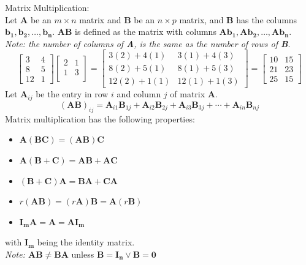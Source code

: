 \documentclass[nobib]{tufte-handout}
\begin{document}
Matrix Multiplication:\\
Let \textbf{A} be an $m\times n$ matrix and \textbf{B} be an $n\times p$ matrix, and \textbf{B} has the columns $\mathbf{b_1,b_2,\ldots,b_n}$. \textbf{AB} is defined as the matrix with columns $\mathbf{Ab_1,Ab_2,\ldots,Ab_n}$.\\
\textit{Note: the number of columns of \textbf{A}, is the same as the number of rows of \textbf{B}}.
\begin{equation*}
    \begin{bmatrix}
        3 & 4\\
        8 & 5\\
        12 & 1
    \end{bmatrix}
    \begin{bmatrix}
        2 & 1\\
        1 & 3\\
    \end{bmatrix}
    =
    \begin{bmatrix}
        3(2)+4(1) & 3(1)+4(3)\\
        8(2)+5(1) & 8(1)+5(3)\\
        12(2)+1(1) & 12(1)+1(3)
    \end{bmatrix} =
    \begin{bmatrix}
        10 & 15\\
        21 & 23\\
        25 & 15
    \end{bmatrix}
\end{equation*}
Let $\mathbf{A}_{ij}$ be the entry in row $i$ and column $j$ of matrix \textbf{A}.
\begin{equation*}
    (\mathbf{AB})_{ij} = \mathbf{A}_{i1}\mathbf{B}_{1j}+\mathbf{A}_{i2}\mathbf{B}_{2j}+\mathbf{A}_{i3}\mathbf{B}_{3j}+\cdots+\mathbf{A}_{in}\mathbf{B}_{nj}
\end{equation*}
Matrix multiplication has the following properties:
\begin{itemize}
    \item $\mathbf{A(BC)=(AB)C}$
    \item $\mathbf{A(B+C)=AB+AC}$
    \item $\mathbf{(B+C)A=BA+CA}$
    \item $r\mathbf{(AB)=(\textit{r}A)B = A(\textit{r}B)}$
    \item $\mathbf{I_mA=A = AI_m}$
\end{itemize}
with $\mathbf{I_m}$ being the identity matrix.\\
\textit{Note: $\mathbf{AB \neq BA}$} unless $\mathbf{B=I_n}\lor \mathbf{B=0}$\\
\end{document}
